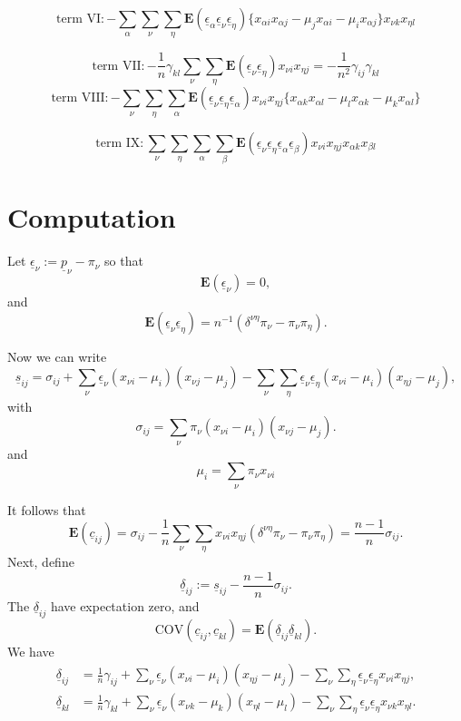 \documentclass[
  12pt,
  letterpaper,
  DIV=11,
  numbers=noendperiod]{scrartcl}
\newcommand{\ul}[1]{\underline{#1}}
\begin{document}
\[
\text{term VI}:-\sum_\alpha\sum_\nu\sum_\eta\mathbf{E}(\ul{\epsilon}_\alpha\ul{\epsilon}_\nu\ul{\epsilon}_\eta)\{x_{\alpha i}x_{\alpha j}
-\mu_jx_{\alpha i}-\mu_ix_{\alpha j}\} x_{\nu k}x_{\eta l}
\]

\[
\text{term VII}:-\frac{1}{n}\gamma_{kl}\sum_\nu\sum_\eta\mathbf{E}(\ul{\epsilon}_\nu\ul{\epsilon}_\eta) x_{\nu i}x_{\eta j}=-\frac{1}{n^2}\gamma_{ij}\gamma_{kl}
\] \[
\text{term VIII}:-\sum_\nu\sum_\eta\sum_\alpha\mathbf{E}(\ul{\epsilon}_\nu\ul{\epsilon}_\eta\ul{\epsilon}_\alpha)x_{\nu i}x_{\eta j}\{x_{\alpha k}x_{\alpha l}
-\mu_lx_{\alpha k}-\mu_kx_{\alpha l}\}
\]

\[
\text{term IX}:\sum_\nu\sum_\eta\sum_\alpha\sum_\beta\mathbf{E}(\ul{\epsilon}_\nu\ul{\epsilon}_\eta\ul{\epsilon}_\alpha\ul{\epsilon}_\beta) x_{\nu i}x_{\eta j}x_{\alpha k}x_{\beta l}
\]

\section{Computation}\label{computation}

Let \(\ul{\epsilon}_\nu:=\ul{p}_\nu-\pi_\nu\) so that \[
\mathbf{E}(\ul{\epsilon}_\nu)=0,
\] and \[
\mathbf{E}(\ul{\epsilon}_\nu\ul{\epsilon}_\eta)=n^{-1}(\delta^{\nu\eta}\pi_\nu-\pi_\nu\pi_\eta).
\]

Now we can write \[
\ul{s}_{ij}=\sigma_{ij}+\sum_\nu \ul{\epsilon}_\nu(x_{\nu i}-\mu_i)(x_{\nu j}-\mu_j)
-\sum_\nu\sum_\eta\ul{\epsilon}_\nu\ul{\epsilon}_\eta(x_{\nu i}-\mu_i)(x_{\eta j}-\mu_j),
\] with \[
\sigma_{ij}=\sum_\nu\pi_\nu(x_{\nu i}-\mu_i)(x_{\nu j}-\mu_j).
\] and \[
\mu_i=\sum_\nu \pi_\nu x_{\nu i}
\]

It follows that \[
\mathbf{E}(\ul{c}_{ij})=\sigma_{ij}-\frac{1}{n}\sum_\nu\sum_\eta x_{\nu i}x_{\eta j}(\delta^{\nu\eta}\pi_\nu-\pi_\nu\pi_\eta)=\frac{n-1}{n}\sigma_{ij}.
\] Next, define \[
\ul{\delta}_{ij}:=\ul{s}_{ij}-\frac{n-1}{n}\sigma_{ij}.
\] The \(\ul{\delta}_{ij}\) have expectation zero, and \[
\text{COV}(\ul{c}_{ij},\ul{c}_{kl})=\mathbf{E}(\ul{\delta}_{ij}\ul{\delta}_{kl}).
\] We have \begin{subequations}
\begin{align}
\ul{\delta}_{ij}&=\frac{1}{n}\gamma_{ij}+\sum_\nu\ul{\epsilon}_\nu(x_{\nu i}-\mu_i)(x_{\eta j}-\mu_j)
-\sum_\nu\sum_\eta\ul{\epsilon}_\nu\ul{\epsilon}_\eta x_{\nu i}x_{\eta j},\label{eq-expd1}\\
\ul{\delta}_{kl}&=\frac{1}{n}\gamma_{kl}+\sum_\nu\ul{\epsilon}_\nu(x_{\nu k}-\mu_k)(x_{\eta l}-\mu_l)
-\sum_\nu\sum_\eta\ul{\epsilon}_\nu\ul{\epsilon}_\eta x_{\nu k}x_{\eta l}.\label{eq-expd2}
\end{align}
\end{subequations}
\end{document}
